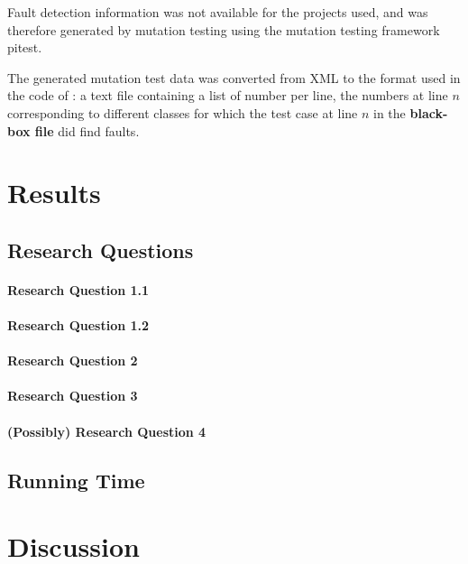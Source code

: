 
Fault detection information was not available for the projects used,
and was therefore generated by mutation testing using the mutation
testing framework pitest.

The generated mutation test data was converted from XML to the format used
in the code of \cite{cruciani2019scalable}: a text file containing a list
of number per line, the numbers at line $n$ corresponding to different
classes for which the test case at line $n$ in the \textbf{black-box file}
did find faults.

\section{Results}

\subsection{Research Questions}

\paragraph{Research Question 1.1}

\paragraph{Research Question 1.2}

\paragraph{Research Question 2}

\paragraph{Research Question 3}

\paragraph{(Possibly) Research Question 4}

\subsection{Running Time}

\section{Discussion}

